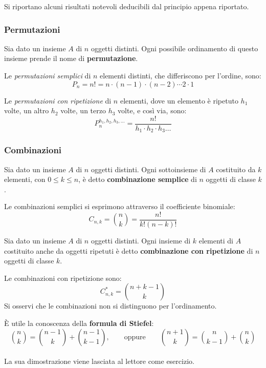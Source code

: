 Si riportano alcuni risultati notevoli deducibili dal principio appena riportato.

\subsubsection{Permutazioni}

\begin{defn}
	Sia dato un insieme $A$ di $n$ oggetti distinti.
	Ogni possibile ordinamento di questo insieme prende il nome di \textbf{permutazione}.
\end{defn}

Le \textit{permutazioni semplici} di $n$ elementi distinti, che differiscono per l'ordine, sono:
$$P_n = n! = n \cdot ( n-1) \cdot (n-2) \cdots 2 \cdot 1 $$

Le \textit{permutazioni con ripetizione} di $n$ elementi, dove un elemento è ripetuto $h_1$ volte, un altro $h_2$ volte, un terzo $h_3$ volte, e così via, sono:
$$P_n^{h_1,h_2,h_3, \dots}=\frac{n!}{h_1 \cdot h_2 \cdot h_3 \dots}$$

\subsubsection{Combinazioni}

\begin{defn}
	Sia dato un insieme $A$ di $n$ oggetti distinti.
	Ogni sottoinsieme di $A$ costituito da $k$ elementi, con $0 \leq k \leq n$, è detto \textbf{combinazione semplice} di $n$ oggetti di classe $k$.
\end{defn}

Le combinazioni semplici si esprimono attraverso il coefficiente binomiale:
$$C_{n,k}=\binom{n}{k}=\frac{n!}{k!(n-k)!}$$

\begin{defn}
	Sia dato un insieme $A$ di $n$ oggetti distinti.
	Ogni insieme di $k$ elementi di $A$ costituito anche da oggetti ripetuti è detto \textbf{combinazione con ripetizione} di $n$ oggetti di classe $k$.
\end{defn}

Le combinazioni con ripetizione sono:
$$C^*_{n,k}={n+k-1 \choose k}$$
Si osservi che le combinazioni non si distinguono per l'ordinamento.

È utile la conoscenza della \textbf{formula di Stiefel}:\\
$$ \binom{n}{k}=\binom{n-1}{k}+\binom{n-1}{k-1}, \qquad \text{oppure}\qquad \binom{n+1}{k}=\binom{n}{k-1}+\binom{n}{k}$$\\
La sua dimostrazione viene lasciata al lettore come esercizio.


